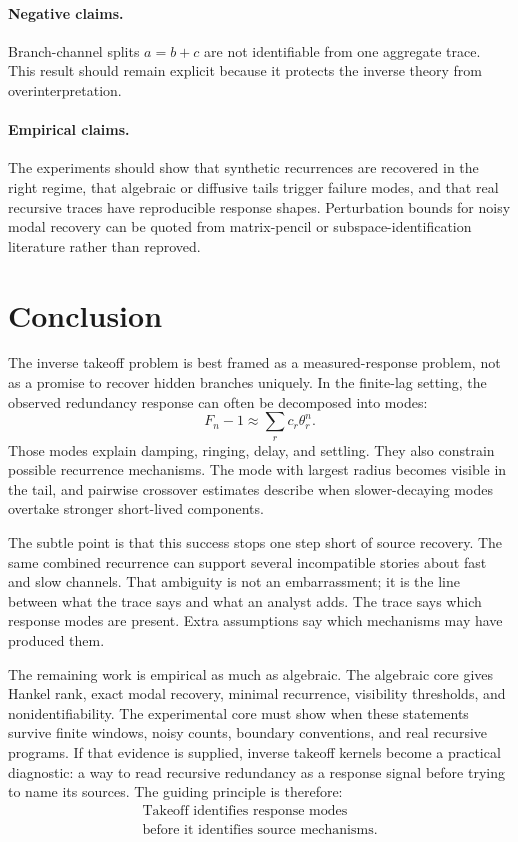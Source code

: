 \documentclass[10pt,twocolumn]{article}
\begin{document}
\paragraph{Negative claims.}
Branch-channel splits \(a=b+c\) are not identifiable from one aggregate trace.
This result should remain explicit because it protects the inverse theory from
overinterpretation.

\paragraph{Empirical claims.}
The experiments should show that synthetic recurrences are recovered in the
right regime, that algebraic or diffusive tails trigger failure modes, and that
real recursive traces have reproducible response shapes. Perturbation bounds
for noisy modal recovery can be quoted from matrix-pencil or
subspace-identification literature rather than reproved.

\section{Conclusion}

The inverse takeoff problem is best framed as a measured-response problem, not
as a promise to recover hidden branches uniquely. In the finite-lag setting,
the observed redundancy response can often be decomposed into modes:
\[
        F_n-1\approx\sum_r c_r\theta_r^n.
\]
Those modes explain damping, ringing, delay, and settling. They also constrain
possible recurrence mechanisms. The mode with largest radius becomes visible in
the tail, and pairwise crossover estimates describe when slower-decaying modes
overtake stronger short-lived components.

The subtle point is that this success stops one step short of source recovery.
The same combined recurrence can support several incompatible stories about
fast and slow channels. That ambiguity is not an embarrassment; it is the line
between what the trace says and what an analyst adds. The trace says which
response modes are present. Extra assumptions say which mechanisms may have
produced them.

The remaining work is empirical as much as algebraic. The algebraic core gives
Hankel rank, exact modal recovery, minimal recurrence, visibility thresholds,
and nonidentifiability. The experimental core must show when these statements
survive finite windows, noisy counts, boundary conventions, and real recursive
programs. If that evidence is supplied, inverse takeoff kernels become a
practical diagnostic: a way to read recursive redundancy as a response signal
before trying to name its sources. The guiding principle is therefore:
\[
        \boxed{
        \begin{gathered}
        \text{Takeoff identifies response modes}\\
        \text{before it identifies source mechanisms.}
        \end{gathered}}
\]
\end{document}
